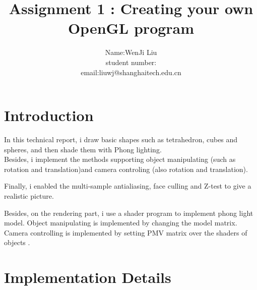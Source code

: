 \documentclass[acmtog]{acmart}
\title{Assignment 1 : Creating your own OpenGL program}
\author{Name:\quad WenJi Liu  \\ student number:\quad 13611756
	\\email:\quad liuwj@shanghaitech.edu.cn}
\begin{document}
\maketitle

\vspace*{2 ex}


\section{Introduction}
 In this technical report, i draw basic shapes such as tetrahedron, cubes and spheres, and then shade them with Phong lighting. \\ Besides, i implement the methods supporting object manipulating (such as rotation and translation)and camera controling (also rotation and translation). 
 \par Finally, i enabled the multi-sample antialiasing, face culling and Z-test to give a realistic picture. 
\par Besides, on the rendering part, i use a shader program to implement phong light model. Object manipulating is implemented by changing the model matrix. Camera controlling is implemented by setting PMV matrix over the shaders of objects .
\section{Implementation Details}
\end{document}
